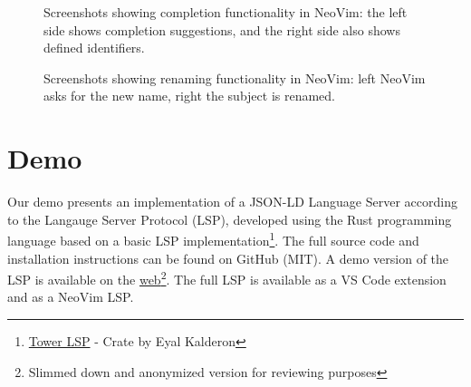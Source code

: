 \documentclass[
]{ceurart}
\begin{document}
\begin{figure}
\centering
{}
\caption{Screenshots showing completion functionality in NeoVim: the left side shows completion suggestions, and the right side also shows defined identifiers.}
\label{fig:complete}
\end{figure}


\begin{figure}
\centering
{}
\caption{Screenshots showing renaming functionality in NeoVim: left NeoVim asks for the new name, right the subject is renamed.}
\label{fig:rename}
\end{figure}


\section{Demo}

Our demo presents an implementation of a JSON-LD Language Server according to the Langauge Server Protocol (LSP), developed using the Rust programming language based on a basic LSP implementation\footnote{\href{https://crates.io/crates/tower-lsp}{Tower LSP} - Crate by Eyal Kalderon}.
The full source code and installation instructions can be found on GitHub (MIT).
A demo version of the LSP is available on the \href{https://jsonld.tiiny.site/}{web}\footnote{Slimmed down and anonymized version for reviewing purposes}.
The full LSP is available as a VS Code extension and as a NeoVim LSP.
\end{document}
